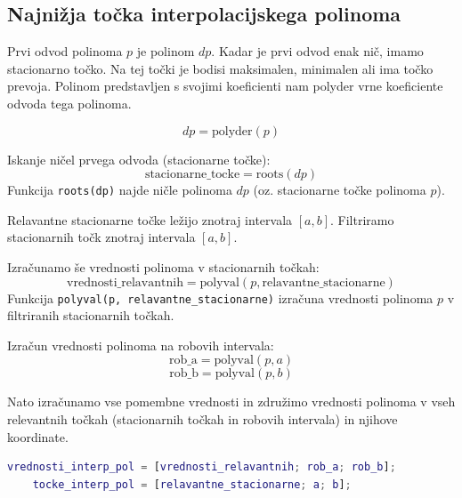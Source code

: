 \documentclass{article}
\begin{document}
        \subsection*{Najnižja točka interpolacijskega polinoma}
        Prvi odvod polinoma \( p \) je polinom \( dp \). Kadar je prvi odvod enak nič, imamo stacionarno točko. Na tej točki je bodisi maksimalen, minimalen ali ima točko prevoja. Polinom predstavljen s svojimi koeficienti nam polyder vrne koeficiente odvoda tega polinoma.

        \begin{equation*}
            dp = \text{polyder}(p)
        \end{equation*}
        
        Iskanje ničel prvega odvoda (stacionarne točke):
        \begin{equation*}
            \text{stacionarne\_tocke} = \text{roots}(dp)
        \end{equation*}
        Funkcija \texttt{roots(dp)} najde ničle polinoma \( dp \) (oz. stacionarne točke polinoma \( p \)).
    
        Relavantne stacionarne točke ležijo znotraj intervala \([a, b]\). Filtriramo stacionarnih točk znotraj intervala \([a, b]\).
    
        Izračunamo še vrednosti polinoma v stacionarnih točkah:
        \begin{equation*}
            \text{vrednosti\_relavantnih} = \text{polyval}(p, \text{relavantne\_stacionarne})
        \end{equation*}
        Funkcija \texttt{polyval(p, relavantne\_stacionarne)} izračuna vrednosti polinoma \( p \) v filtriranih stacionarnih točkah.
    
        Izračun vrednosti polinoma na robovih intervala:
        \begin{equation*}
            \text{rob\_a} = \text{polyval}(p, a)
        \end{equation*}
        \begin{equation*}
            \text{rob\_b} = \text{polyval}(p, b)
        \end{equation*}
    
        Nato izračunamo vse pomembne vrednosti in združimo vrednosti polinoma v vseh relevantnih točkah (stacionarnih točkah in robovih intervala) in njihove koordinate.
        
        \begin{lstlisting}[language=Matlab]
    vrednosti_interp_pol = [vrednosti_relavantnih; rob_a; rob_b];
    tocke_interp_pol = [relavantne_stacionarne; a; b];
        \end{lstlisting}
\end{document}
